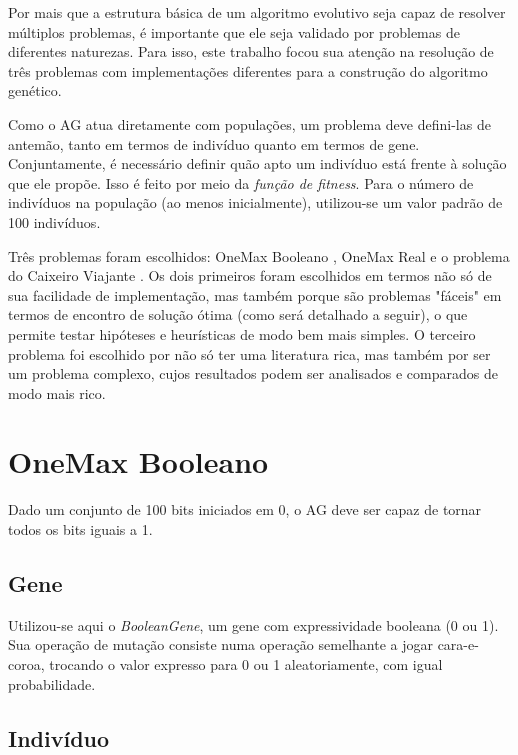 \label{2_problemas}

Por mais que a estrutura básica de um algoritmo evolutivo seja capaz de resolver múltiplos problemas, é importante que ele seja validado por problemas de diferentes naturezas. Para isso, este trabalho focou sua atenção na resolução de três problemas com implementações diferentes para a construção do algoritmo genético.

Como o AG atua diretamente com populações, um problema deve defini-las de antemão, tanto em termos de indivíduo quanto em termos de gene. Conjuntamente, é necessário definir quão apto um indivíduo está frente à solução que ele propõe. Isso é feito por meio da \emph{função de fitness}. Para o número de indivíduos na população (ao menos inicialmente), utilizou-se um valor padrão de 100 indivíduos.

Três problemas foram escolhidos: OneMax Booleano \cite{giguere1998population}, OneMax Real e o problema do Caixeiro Viajante \cite{applegate2011traveling}. Os dois primeiros foram escolhidos em termos não só de sua facilidade de implementação, mas também porque são problemas "fáceis" em termos de encontro de solução ótima (como será detalhado a seguir), o que permite testar hipóteses e heurísticas de modo bem mais simples. O terceiro problema foi escolhido por não só ter uma literatura rica, mas também por ser um problema complexo, cujos resultados podem ser analisados e comparados de modo mais rico.

\section{OneMax Booleano}

Dado um conjunto de 100 bits iniciados em 0, o AG deve ser capaz de tornar todos os bits iguais a 1.

\subsection*{Gene}

Utilizou-se aqui o \emph{BooleanGene}, um gene com expressividade booleana (0 ou 1). Sua operação de mutação consiste numa operação semelhante a jogar cara-e-coroa, trocando o valor expresso para 0 ou 1 aleatoriamente, com igual probabilidade.

\subsection*{Indivíduo}

